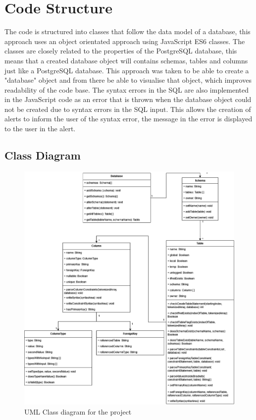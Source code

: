 \section{Code Structure}

The code is structured into classes that follow the data model of a database, this approach uses an object orientated approach using JavaScript ES6 classes. The classes are closely related to the properties of the PostgreSQL database, this means that a created database object will contains schemas, tables and columns just like a PostgreSQL database. This approach was taken to be able to create a "database" object and from there be able to visualise that object, which improves readability of the code base. The syntax errors in the SQL are also implemented in the JavaScript code as an error that is thrown when the database object could not be created due to syntax errors in the SQL input. This allows the creation of alerts to inform the user of the syntax error, the message in the error is displayed to the user in the alert.  

\newpage

\subsection{Class Diagram}

\begin{figure}[h!]
	\centering
	\includegraphics[width=\textwidth]{classDiagram}
	\caption{UML Class diagram for the project}
	\label{fig:classDiagram}
\end{figure}


